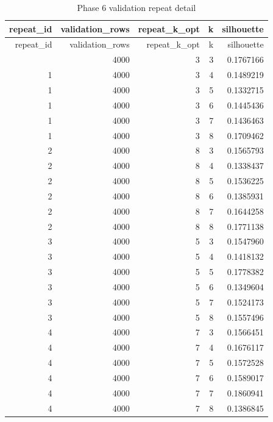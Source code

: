 \documentclass[
]{article}
\begin{document}
\begin{longtable}[]{@{}rrrrr@{}}
\caption{Phase 6 validation repeat detail}\tabularnewline
\toprule\noalign{}
repeat\_id & validation\_rows & repeat\_k\_opt & k & silhouette \\
\midrule\noalign{}
\endfirsthead
\toprule\noalign{}
repeat\_id & validation\_rows & repeat\_k\_opt & k & silhouette \\
\midrule\noalign{}
\endhead
\bottomrule\noalign{}
\endlastfoot
1 & 4000 & 3 & 3 & 0.1767166 \\
1 & 4000 & 3 & 4 & 0.1489219 \\
1 & 4000 & 3 & 5 & 0.1332715 \\
1 & 4000 & 3 & 6 & 0.1445436 \\
1 & 4000 & 3 & 7 & 0.1436463 \\
1 & 4000 & 3 & 8 & 0.1709462 \\
2 & 4000 & 8 & 3 & 0.1565793 \\
2 & 4000 & 8 & 4 & 0.1338437 \\
2 & 4000 & 8 & 5 & 0.1536225 \\
2 & 4000 & 8 & 6 & 0.1385931 \\
2 & 4000 & 8 & 7 & 0.1644258 \\
2 & 4000 & 8 & 8 & 0.1771138 \\
3 & 4000 & 5 & 3 & 0.1547960 \\
3 & 4000 & 5 & 4 & 0.1418132 \\
3 & 4000 & 5 & 5 & 0.1778382 \\
3 & 4000 & 5 & 6 & 0.1349604 \\
3 & 4000 & 5 & 7 & 0.1524173 \\
3 & 4000 & 5 & 8 & 0.1557496 \\
4 & 4000 & 7 & 3 & 0.1566451 \\
4 & 4000 & 7 & 4 & 0.1676117 \\
4 & 4000 & 7 & 5 & 0.1572528 \\
4 & 4000 & 7 & 6 & 0.1589017 \\
4 & 4000 & 7 & 7 & 0.1860941 \\
4 & 4000 & 7 & 8 & 0.1386845 \\
\end{longtable}
\end{document}

